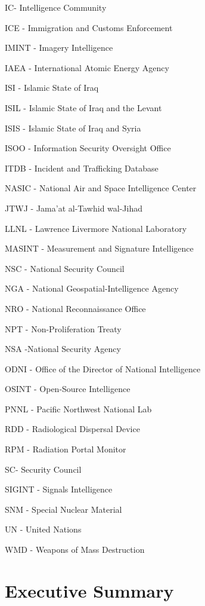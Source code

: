 \documentclass{report}
\begin{document}
IC- Intelligence Community

ICE - Immigration and Customs Enforcement

IMINT - Imagery Intelligence 

IAEA - International Atomic Energy Agency 

ISI - Islamic State of Iraq

ISIL - Islamic State of Iraq and the Levant

ISIS - Islamic State of Iraq and Syria

ISOO - Information Security Oversight Office

ITDB - Incident and Trafficking Database

NASIC - National Air and Space Intelligence Center 

JTWJ - Jama'at al-Tawhid wal-Jihad 

LLNL - Lawrence Livermore National Laboratory

MASINT - Measurement and Signature Intelligence 

NSC - National Security Council  

NGA - National Geospatial-Intelligence Agency 

NRO - National Reconnaissance Office

NPT - Non-Proliferation Treaty

NSA -National Security Agency

ODNI - Office of the Director of National Intelligence

OSINT - Open-Source Intelligence

PNNL - Pacific Northwest National Lab

RDD - Radiological Dispersal Device

RPM - Radiation Portal Monitor

SC- Security Council

SIGINT - Signals Intelligence 

SNM - Special Nuclear Material

UN - United Nations

WMD - Weapons of Mass Destruction

\newpage

\pagestyle{fancy2}


\chapter{Executive Summary}
\end{document}
